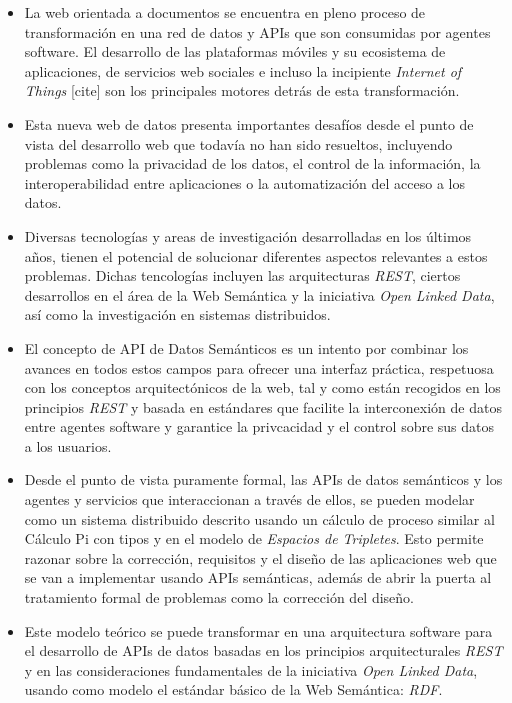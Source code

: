 \begin{itemize}
  \item La web orientada a documentos se encuentra en pleno proceso de transformaci\'on en una red de datos y APIs que son consumidas por agentes software. El desarrollo de las plataformas m\'oviles y su ecosistema de aplicaciones, de servicios web sociales e incluso la incipiente \textit{Internet of Things} [cite] son los principales motores detr\'as de esta transformaci\'on.
  \item Esta nueva web de datos presenta importantes desaf\'ios desde el punto de vista del desarrollo web que todav\'ia no han sido resueltos, incluyendo problemas como la privacidad de los datos, el control de la informaci\'on, la interoperabilidad entre aplicaciones o la automatizaci\'on del acceso a los datos.
  \item Diversas tecnolog\'ias y areas de investigaci\'on desarrolladas en los \'ultimos a\~nos, tienen el potencial de solucionar diferentes aspectos relevantes a estos problemas. Dichas tencolog\'ias incluyen las arquitecturas \textit{REST}, ciertos desarrollos en el \'area de la Web Sem\'antica y la iniciativa \textit{Open Linked Data}, as\'i como la investigaci\'on en sistemas distribuidos.
  \item El concepto de API de Datos Sem\'anticos es un intento por combinar los avances en todos estos campos para ofrecer una interfaz pr\'actica, respetuosa con los conceptos arquitect\'onicos de la web, tal y como est\'an recogidos en los principios \textit{REST} y basada en est\'andares que facilite la interconexi\'on de datos entre agentes software y garantice la privcacidad y el control sobre sus datos a los usuarios.
  \item Desde el punto de vista puramente formal, las APIs de datos sem\'anticos y los agentes y servicios que interaccionan a trav\'es de ellos, se pueden modelar como un sistema distribuido descrito usando un c\'alculo de proceso similar al C\'alculo Pi con tipos y en el modelo de \textit{Espacios de Tripletes}. Esto permite razonar sobre la correcci\'on, requisitos y el dise\~no de las aplicaciones web que se van a implementar usando APIs sem\'anticas, adem\'as de abrir la puerta al tratamiento formal de problemas como la correcci\'on del dise\~no.
  \item Este modelo te\'orico se puede transformar en una arquitectura software para el desarrollo de APIs de datos basadas en los principios arquitecturales \textit{REST} y en las consideraciones fundamentales de la iniciativa \textit{Open Linked Data}, usando como modelo el est\'andar b\'asico de la Web Sem\'antica: \textit{RDF}.

\end{itemize}
